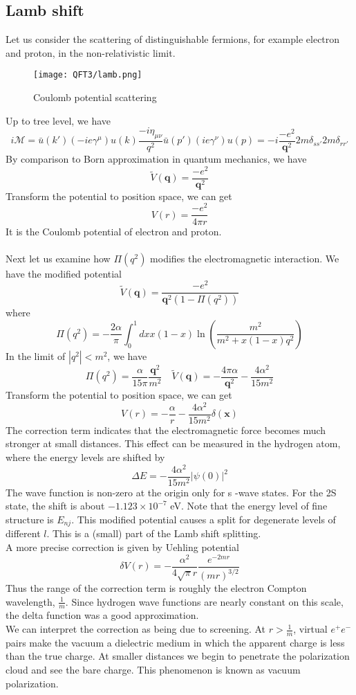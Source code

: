 \documentclass[cyan]{elegantnote}
\begin{document}
\subsection{Lamb shift}
Let us consider the scattering of distinguishable fermions, for example electron and proton, in the non-relativistic limit. 

\begin{figure}[!h]
\centering
\texttt{[image: QFT3/lamb.png]}
\caption{Coulomb potential scattering} 
\end{figure}

\noindent
Up to tree level, we have
\[i\mathcal{M} = \bar{u}(k')(-ie\gamma^{\mu})u(k) \frac{-i\eta_{\mu\nu}}{q^2} \bar{u}(p')(ie\gamma^{\nu})u(p) = -i \frac{-e^2}{\bm{q}^2} 2m \delta_{ss'} 2m\delta_{rr'}\]
By comparison to Born approximation in quantum mechanics, we have
\[\tilde{V}(\bm{q}) = \frac{-e^2}{\bm{q}^2}\]
Transform the potential to position space, we can get
\[V(r) = \frac{-e^2}{4\pi r}\]
It is the Coulomb potential of electron and proton.
\\ \\
Next let us examine how $\Pi(q^2)$ modifies the electromagnetic interaction. We have the modified potential
\[\tilde{V}(\bm{q}) = \frac{-e^2}{\bm{q}^2(1-\Pi(q^2))}\]
where
\[\Pi(q^2) = -\frac{2\alpha}{\pi} \int_0^1 dx x(1-x) \ln \left( \frac{m^2}{m^2 + x(1-x)q^2} \right)\]
In the limit of $|q^2|<m^2$, we have
\[\Pi(q^2) = \frac{\alpha}{15\pi}\frac{\bm{q}^2}{m^2} \quad \tilde{V}(\bm{q}) = -\frac{4\pi\alpha}{\bm{q}^2} - \frac{4\alpha^2}{15m^2}\]
Transform the potential to position space, we can get
\[V(r) = -\frac{\alpha}{r} - \frac{4\alpha^2}{15m^2} \delta(\bm{x})\]
The correction term indicates that the electromagnetic force becomes much stronger at small distances. This effect can be measured in the hydrogen atom, where the energy levels are shifted by
\[\Delta E = - \frac{4\alpha^2}{15m^2} |\psi(0)|^2\]
The wave function is non-zero at the origin only for s -wave states. For the 2S state, the shift is about $-1.123 \times 10^{-7}$ eV. Note that the energy level of fine structure is $E_{nj}$. This modified potential causes a split for degenerate levels of different $l$. This is a (small) part of the Lamb shift splitting. \\
A more precise correction is given by Uehling potential
\[\delta V(r) = -\frac{\alpha^2}{4\sqrt{\pi}r} \frac{e^{-2mr}}{(mr)^{3/2}}\]
Thus the range of the correction term is roughly the electron Compton wavelength, $\frac{1}{m}$. 
Since hydrogen wave functions are nearly constant on this scale, the delta function was a good approximation.\\
We can interpret the correction as being due to screening. At $r > \frac{1}{m}$, virtual $e^+e^-$ pairs make the vacuum a dielectric medium in which the apparent charge is less than the true charge. 
At smaller distances we begin to penetrate the polarization cloud and see the bare charge. This phenomenon is known as vacuum polarization.
\end{document}
